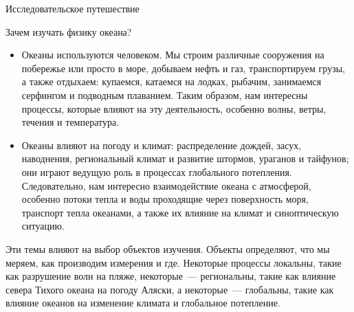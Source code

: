 \begin{chapter}{Исследовательское путешествие}
\begin{section}{Зачем изучать физику океана?}
\begin{itemize}
\item
Океаны используются человеком. Мы строим различные сооружения на побережье 
или просто в море, добываем нефть и газ, транспортируем грузы, а также 
отдыхаем: купаемся, катаемся на лодках, рыбачим, занимаемся серфингом 
и подводным плаванием. Таким образом, нам интересны процессы, которые 
влияют на эту деятельность, особенно волны, ветры, течения и температура.
%

\item
Океаны влияют на погоду и климат: распределение дождей, засух, 
наводнения, региональный климат и развитие штормов, ураганов и тайфунов; 
они играют ведущую роль в процессах глобального потепления. 
Следовательно, нам интересно взаимодействие океана с атмосферой, 
особенно потоки тепла и воды проходящие через поверхность моря, 
транспорт тепла океанами, а также их влияние на климат и синоптическую 
ситуацию.
%
\end{itemize}

Эти темы влияют на выбор объектов изучения. Объекты определяют, что мы меряем, 
как производим измерения и где. Некоторые процессы локальны, такие как 
разрушение волн на пляже, некоторые~--- региональны, такие как влияние севера 
Тихого океана на погоду Аляски, а некоторые~--- глобальны, такие как влияние 
океанов на изменение климата и глобальное потепление.
%
 

\end{section}
\end{chapter}
